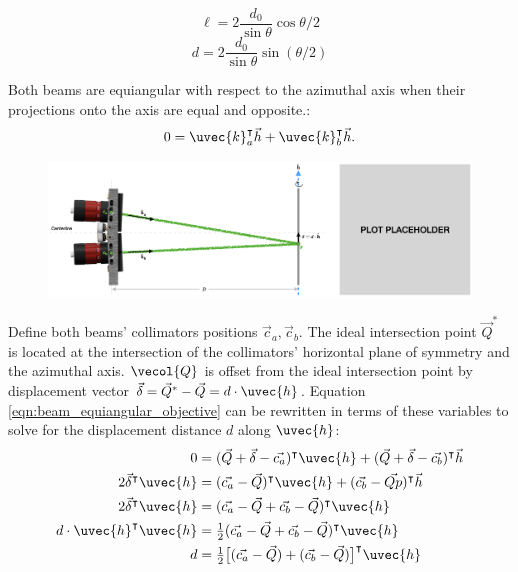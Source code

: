%
\begin{equation}
    \ell = 2 \frac{d_0}{\sin{\theta}} \cos{\theta/2}
\end{equation}
%
\begin{equation}
    d = 2 \frac{d_0}{\sin{\theta}} \sin{(\theta/2)}
\end{equation}

Both beams are equiangular with respect to the azimuthal axis when their projections onto the axis are equal and opposite.:
\begin{equation}
    0 = \uvec{k}_a^\intercal \vec{h} + \uvec{k}_b^\intercal \vec{h}.
    \label{eqn:beam_equiangular_objective}
\end{equation}

\begin{figure}
    \centering
    \includegraphics[width=\linewidth]{figures/beam_alignment_geometry.png}
    \caption{}
    \label{fig:beam_alignment_geometry}
\end{figure}
%
Define both beams' collimators positions $\vec{c}_a, \vec{c}_b$. The ideal intersection point $\vec{Q}^*$ is located at the intersection of the collimators' horizontal plane of symmetry and the azimuthal axis. $\vecol{Q}$ is offset from the ideal intersection point by displacement vector $\vec{\delta} = \vec{Q}^* - \vec{Q} = d \cdot \uvec{h}$. Equation \ref{eqn:beam_equiangular_objective} can be rewritten in terms of these variables to solve for the displacement distance $d$ along $\uvec{h}$:
\begin{equation}
    \begin{split}
    0 &= (\vec{Q} + \vec{\delta} - \vec{c_a})^\intercal \uvec{h} + (\vec{Q} + \vec{\delta} - \vec{c_b})^\intercal \vec{h} \\
    2 \vec{\delta}^\intercal \uvec{h} &= (\vec{c_a} - \vec{Q})^\intercal \uvec{h} + (\vec{c_b} - \vec{Qp})^\intercal \vec{h} \\
    2 \vec{\delta}^\intercal \uvec{h} &= (\vec{c_a} - \vec{Q} + \vec{c_b} - \vec{Q})^\intercal \uvec{h} \\
    d \cdot \uvec{h}^\intercal \uvec{h} &= \tfrac{1}{2} (\vec{c_a} - \vec{Q} + \vec{c_b} - \vec{Q})^\intercal \uvec{h} \\
    d &= \tfrac{1}{2} \big[(\vec{c_a} - \vec{Q}) + (\vec{c_b} - \vec{Q})\big]^\intercal \uvec{h}
    \end{split}
\end{equation}
